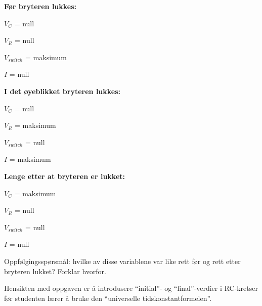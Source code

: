





\noindent
{\bf Før bryteren lukkes:}

$V_{C}$ = null

$V_{R}$ = null

$V_{switch}$ = maksimum

$I$ = null

\vskip 10pt
\goodbreak

\noindent
{\bf I det øyeblikket bryteren lukkes:}

$V_{C}$ = null

$V_{R}$ = maksimum

$V_{switch}$ = null

$I$ = maksimum

\vskip 10pt
\goodbreak

\noindent
{\bf Lenge etter at bryteren er lukket:}

$V_{C}$ = maksimum

$V_{R}$ = null

$V_{switch}$ = null

$I$ = null

\vskip 10pt

Oppfølgingsspørsmål: hvilke av disse variablene var like rett før og rett etter bryteren lukket? Forklar hvorfor.







Hensikten med oppgaven er å introdusere ``initial''- og ``final''-verdier i RC-kretser før studenten lærer å bruke den ``universelle tidskonstantformelen''.



